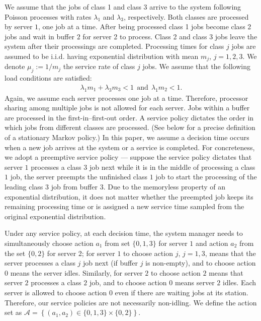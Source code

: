 \documentclass[11pt]{article}
\newcommand{\A}{\mathcal{A}}
\theoremstyle{definition}
\numberwithin{equation}{section}
\begin{document}
We assume that the jobs of class 1 and class 3 arrive to the
system following Poisson processes with rates $\lambda_1$ and
 $\lambda_3$, respectively. Both classes are
processed by server $1$, one job at a time. After being processed class 1 jobs become  class 2 jobs and wait in buffer $2$ for server 2 to process. Class 2 and class 3
jobs   leave the system after their processings
are completed.  Processing times for class $j$ jobs are assumed to be  i.i.d. having exponential
distribution with mean $m_j$, $j=1, 2, 3$. We denote $\mu_j := 1/m_j$
the service rate of class $j$ jobs. We assume that the following load conditions are satisfied:
\begin{align}\label{eq:load_cc}
\lambda_1m_1+\lambda_3m_3<1  ~~\text{and}~~ \lambda_1m_2<1.
\end{align}
Again, we assume each server processes one job at a time. Therefore,
processor sharing among multiple jobs is not allowed for each
server. Jobs within a buffer are processed in the first-in--first-out
order.  A service policy dictates the order in which jobs from
different classes are processed. (See below for a precise definition of a stationary Markov policy.)  In this paper, we assume a decision
time occurs when a new job arrives at the system or a service is
completed.  For concreteness, we adopt a preemptive service policy --- suppose the service policy dictates that server $1$
  processes a class $3$ job next while it is in the middle of processing
  a class $1$ job, the server preempts the unfinished class $1$ job to start the processing of the leading class $3$ job from buffer $3$. Due to the memoryless property of  an exponential distribution, it does not matter whether the preempted job keeps its remaining processing time or is assigned a new service time sampled from the original exponential distribution.

  Under any service policy,
at each decision time, the system manager needs to simultaneously choose  action $a_1$ from set $\{0, 1, 3\}$ for server $1$ and  action $a_2$ from the set $\{0, 2\}$ for server 2; for server $1$ to choose action $j$, $j=1, 3$, means that the server processes a class $j$ job next (if buffer $j$ is non-empty), and to choose action $0$ means the server idles. Similarly,
for server $2$ to choose action $2$ means that server $2$ processes a class $2$ job, and to choose action $0$ means server $2$ idles.  Each server is allowed to choose  action $0$ even if there are waiting jobs at its station.
Therefore, our service policies are not necessarily non-idling. We define the action set as $\A =\left\{ (a_1, a_2)\in  \{0, 1, 3\}\times \{0, 2\}\right\}$.
\end{document}
